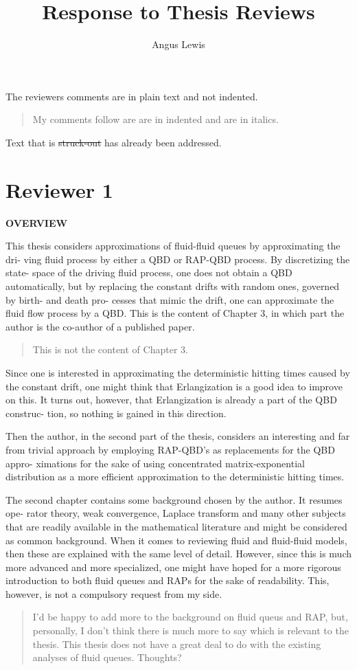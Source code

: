 \documentclass[a4paper]{article}
\title{Response to Thesis Reviews}
\author{Angus Lewis}
\begin{document}
\maketitle
The reviewers comments are in plain text and not indented. 
\begin{quote}
    My comments follow are are in indented and are in italics. 
\end{quote}
Text that is \st{struck-out} has already been addressed.

\pagebreak
\section{Reviewer 1}

\textbf{OVERVIEW} 

This thesis considers approximations of fluid-fluid queues by approximating the dri-
ving fluid process by either a QBD or RAP-QBD process. By discretizing the state-
space of the driving fluid process, one does not obtain a QBD automatically, but by
replacing the constant drifts with random ones, governed by birth- and death pro-
cesses that mimic the drift, one can approximate the fluid flow process by a QBD.
This is the content of Chapter 3, in which part the author is the co-author of a
published paper.
\begin{quote}
    This is not the content of Chapter 3. 
\end{quote}

Since one is interested in approximating the deterministic hitting times caused by
the constant drift, one might think that Erlangization is a good idea to improve on
this. It turns out, however, that Erlangization is already a part of the QBD construc-
tion, so nothing is gained in this direction.

Then the author, in the second part of the thesis, considers an interesting and far
from trivial approach by employing RAP-QBD's as replacements for the QBD appro-
ximations for the sake of using concentrated matrix-exponential distribution as a
more efficient approximation to the deterministic hitting times.

The second chapter contains some background chosen by the author. It resumes ope-
rator theory, weak convergence, Laplace transform and many other subjects that are
readily available in the mathematical literature and might be considered as common
background. When it comes to reviewing fluid and fluid-fluid models, then these are
explained with the same level of detail. However, since this is much more advanced
and more specialized, one might have hoped for a more rigorous introduction to both
fluid queues and RAPs for the sake of readability. This, however, is not a compulsory
request from my side.
\begin{quote}
    I'd be happy to add more to the background on fluid queus and RAP, but, personally, I don't think there is much more to say which is relevant to the thesis. This thesis does not have a great deal to do with the existing analyses of fluid queues. Thoughts?
\end{quote}
\end{document}
